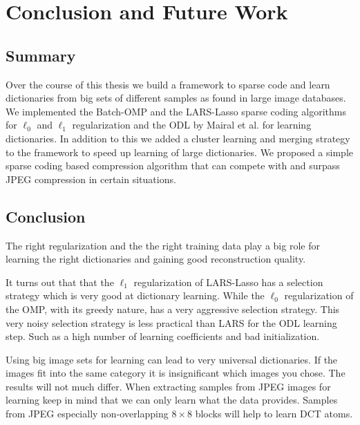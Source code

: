 \chapter{Conclusion and Future Work}

\section{Summary}
Over the course of this thesis we build a framework to sparse code and learn
dictionaries from big sets of different samples as found in large image
databases. We implemented the Batch-OMP and the LARS-Lasso sparse coding
algorithms for $\ell_0$ and $\ell_1$ regularization and the ODL by Mairal et
al. for learning dictionaries. 
In addition to this we added a cluster learning and merging strategy to the
framework to speed up learning of large dictionaries. We proposed a simple
sparse coding based compression algorithm that can compete with and surpass JPEG
compression in certain situations.


\section{Conclusion}
The right regularization and the the right training data
play a big role for learning the right dictionaries and gaining
good reconstruction quality. 

It turns out that that the $\ell_1$ regularization of LARS-Lasso has a selection
strategy which is very good at dictionary learning.
While the $\ell_0$ regularization of the OMP, with its greedy nature, has a very
aggressive selection strategy.  This very noisy selection strategy is less
practical than LARS for the ODL learning step. Such as a high number of learning
coefficients and bad initialization. 


Using big image sets for learning can lead to very universal dictionaries. If
the images fit into the same category it is insignificant which images you
chose. The results will not much differ. When extracting samples from JPEG
images for learning keep in mind that we can only learn what the data provides.
Samples from JPEG especially non-overlapping $8 \times 8$ blocks will help to
learn DCT atoms.


